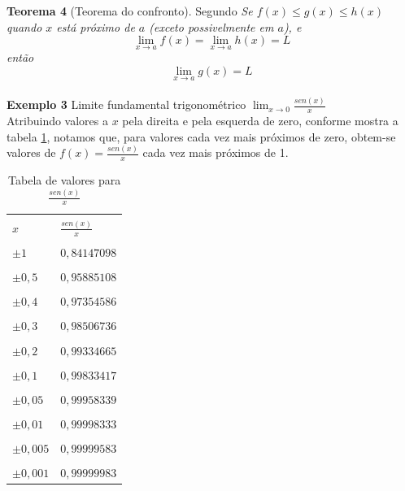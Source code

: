 \textbf{Teorema 4}
(Teorema do confronto). Segundo  \textit{Se $f(x) \leq g(x) \leq h(x)$ quando $x$ está próximo de $a$ (exceto possivelmente em $a$), e 
$$
\lim_{x \to a} f(x) = \lim_{x \to a} h(x) = L
$$
então
$$
\lim_{x \to a} g(x) = L
$$
}\\

\textbf{Exemplo 3} Limite fundamental trigonométrico $\displaystyle \lim_{x \to 0} \frac{sen(x)}{x}$\\ 

Atribuindo valores a $x$ pela direita e pela esquerda de zero, conforme mostra a tabela \ref{tab:sen}, notamos que, para valores cada vez mais próximos de zero, obtem-se valores de $\displaystyle f(x) = \frac{sen(x)}{x}$  cada vez mais próximos de 1.

\begin{table}[H]
\centering
\caption{Tabela de valores para $\displaystyle \frac{sen(x)}{x}$}
\label{tab:sen}
\smallskip
\begin{tabular}{l|l}
\hline
&\\[-2ex]
 $x$ & $\displaystyle \frac{sen(x)}{x}$ \\[0.5ex]
\hline
&\\[-2ex]
$\displaystyle \pm 1$ & $0,84147098$ \\[0.5ex]
\hline
&\\[-2ex]
$\pm 0,5$ & $0,95885108$ \\[0.5ex]
\hline
&\\[-2ex]
$\pm 0,4$ & $0,97354586$ \\[0.5ex]
\hline
&\\[-2ex]
$\pm 0,3$ & $0,98506736$ \\[0.5ex]
\hline
&\\[-2ex]
$\pm 0,2$ & $0,99334665$ \\[0.5ex]
\hline
&\\[-2ex]
$\pm 0,1$ & $0,99833417$ \\[0.5ex]
\hline
&\\[-2ex]
$\pm 0,05$ & $0,99958339$ \\[0.5ex]
\hline
&\\[-2ex]
$\pm 0,01$ & $0,99998333$ \\[0.5ex]
\hline
&\\[-2ex]
$\pm 0,005$ & $0,99999583$ \\[0.5ex]
\hline
&\\[-2ex]
$\pm 0,001$ & $0,99999983$ \\[0.5ex]
\hline
\end{tabular}
\end{table}

